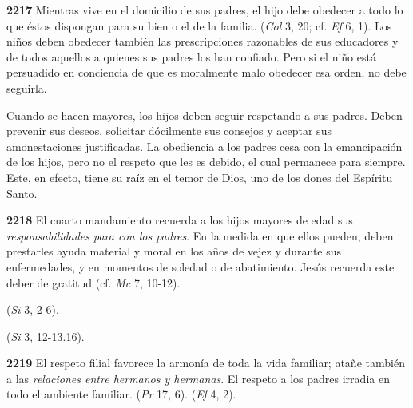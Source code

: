 \textbf{2217} Mientras vive en el domicilio de sus padres, el hijo debe obedecer a todo lo que éstos dispongan para su bien o el de la familia.  (\emph{Col} 3, 20; cf. \emph{Ef} 6, 1). Los niños deben obedecer también las prescripciones razonables de sus educadores y de todos aquellos a quienes sus padres los han confiado. Pero si el niño está persuadido en conciencia de que es moralmente malo obedecer esa orden, no debe seguirla.

Cuando se hacen mayores, los hijos deben seguir respetando a sus padres. Deben prevenir sus deseos, solicitar dócilmente sus consejos y aceptar sus amonestaciones justificadas. La obediencia a los padres cesa con la emancipación de los hijos, pero no el respeto que les es debido, el cual permanece para siempre. Este, en efecto, tiene su raíz en el temor de Dios, uno de los dones del Espíritu Santo.

\textbf{2218} El cuarto mandamiento recuerda a los hijos mayores de edad sus \emph{responsabilidades para con los padres}. En la medida en que ellos pueden, deben prestarles ayuda material y moral en los años de vejez y durante sus enfermedades, y en momentos de soledad o de abatimiento. Jesús recuerda este deber de gratitud (cf. \emph{Mc} 7, 10-12).

 (\emph{Si} 3, 2-6).

 (\emph{Si} 3, 12-13.16).

\textbf{2219} El respeto filial favorece la armonía de toda la vida familiar; atañe también a las \emph{relaciones entre hermanos y hermanas}. El respeto a los padres irradia en todo el ambiente familiar.  (\emph{Pr} 17, 6).  (\emph{Ef} 4, 2).

